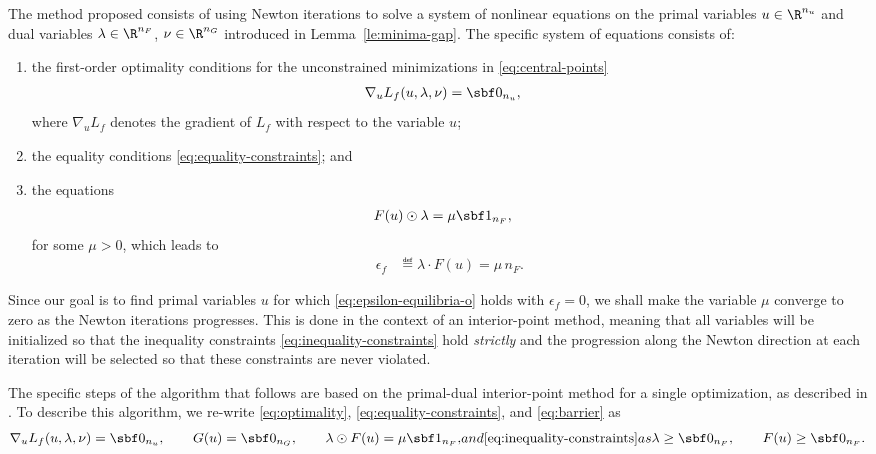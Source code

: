 \documentclass[11pt]{article}
\begin{document}
The method proposed consists of using Newton iterations to solve a
system of nonlinear equations on the primal variables $u\in\R^{n_u}$
and dual variables $\lambda\in\R^{n_F}$, $\nu\in\R^{n_G}$ introduced in
Lemma~\ref{le:minima-gap}. The specific system of equations
consists of:
\begin{enumerate}
\item the first-order optimality conditions for the unconstrained
  minimizations in \eqref{eq:central-points}
  \begin{align}\label{eq:optimality}
    \nabla_u L_f(u,\lambda,\nu)&=\sbf 0_{n_u}, &
  \end{align}
  where $\nabla_u L_f$ denotes the gradient of $L_f$ with respect to the
  variable $u$;
\item the equality conditions \eqref{eq:equality-constraints}; and
\item the equations
  \begin{align}\label{eq:barrier}
    F(u)\odot\lambda&=\mu\sbf 1_{n_F},
  \end{align}
  for some $\mu>0$, which leads to
  \begin{align*}
    \epsilon_f&\eqdef \lambda\cdot F(u)=\mu\, n_F.
  \end{align*}
\end{enumerate}
Since our goal is to find primal variables $u$ for which
\eqref{eq:epsilon-equilibria-o} holds with $\epsilon_f=0$, we shall make the
variable $\mu$ converge to zero as the Newton iterations
progresses. This is done in the context of an interior-point method,
meaning that all variables will be initialized so that the inequality
constraints \eqref{eq:inequality-constraints} hold \emph{strictly} and
the progression along the Newton direction at each iteration will be
selected so that these constraints are never violated.

\medskip

The specific steps of the algorithm that follows are based on the
primal-dual interior-point method for a single optimization, as
described in \cite{Vandenberghe2010}. To describe this algorithm, we
re-write \eqref{eq:optimality}, \eqref{eq:equality-constraints}, and
\eqref{eq:barrier} as
\begin{subequations}\label{eq:primal-dual}
  \begin{gather}
    \label{eq:primal-dual-equalities}
    \nabla_u L_f(u,\lambda,\nu)=\sbf 0_{n_u}, \qquad
    G(u)=\sbf 0 _{n_G}, \qquad
    \lambda\odot F(u)=\mu\sbf 1_{n_F}, 
  \end{gather}
and \eqref{eq:inequality-constraints} as
\begin{gather}
  \label{eq:primal-dual-inequalities}
  \lambda\ge \sbf 0_{n_F}, \qquad F(u)\ge \sbf 0_{n_F}.
\end{gather}
\end{subequations}
\end{document}
